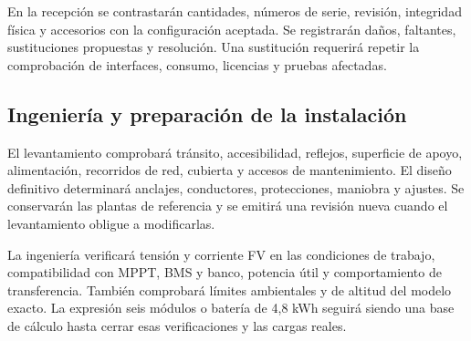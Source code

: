 
En la recepción se contrastarán cantidades, números de serie, revisión, integridad física y accesorios con la configuración aceptada. Se registrarán daños, faltantes, sustituciones propuestas y resolución. Una sustitución requerirá repetir la comprobación de interfaces, consumo, licencias y pruebas afectadas.

\subsection{Ingeniería y preparación de la instalación}
El levantamiento comprobará tránsito, accesibilidad, reflejos, superficie de apoyo, alimentación, recorridos de red, cubierta y accesos de mantenimiento. El diseño definitivo determinará anclajes, conductores, protecciones, maniobra y ajustes. Se conservarán las plantas de referencia y se emitirá una revisión nueva cuando el levantamiento obligue a modificarlas.

La ingeniería verificará tensión y corriente FV en las condiciones de trabajo, compatibilidad con MPPT, BMS y banco, potencia útil y comportamiento de transferencia. También comprobará límites ambientales y de altitud del modelo exacto. La expresión seis módulos o batería de 4,8 kWh seguirá siendo una base de cálculo hasta cerrar esas verificaciones y las cargas reales.

